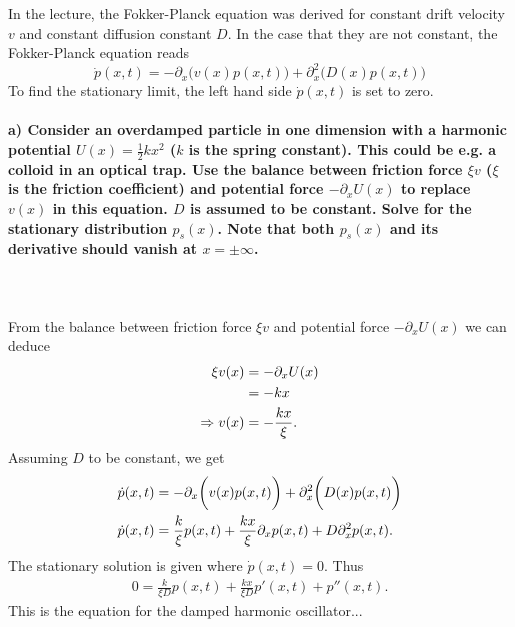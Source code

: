 In the lecture, the Fokker-Planck equation was derived for constant 
drift velocity $v$ and constant diffusion constant $D$. In the case 
that they are not constant, the Fokker-Planck equation reads
\begin{equation}
    \dot{p}(x,t)=-\partial_x\bigg(v(x)p(x,t)\bigg)+
    \partial_x^2\bigg(D(x)p(x,t)\bigg)
    \label{eq:fokker}
\end{equation}
To find the stationary limit, the left hand side $\dot p(x,t)$ is set 
to zero.

\paragraph{a) Consider an overdamped particle in one dimension with a 
    harmonic potential $U(x)=\frac{1}{2}kx^2$ ($k$ is the spring 
    constant). This could be e.g. a colloid in an optical trap. Use the 
    balance between friction force $\xi v$ ($\xi$ is the friction
    coefficient) and potential force $-\partial_xU(x)$ to replace 
    $v(x)$ in this equation. $D$ is assumed to be constant. Solve for 
    the stationary distribution $p_s(x)$. Note that both $p_s(x)$ and 
    its derivative should vanish at $x=\pm\infty$.
} \ \\
\\
    From the balance between friction force $\xi v$ and potential force 
    $-\partial_xU(x)$ we can deduce
    \begin{align}
        \xi v(x) 
        &= -\partial_xU(x) \notag \\
        &= -kx \notag \\
        \Rightarrow v(x) 
        &= -\frac{kx}{\xi}.
    \end{align}
    Assuming $D$ to be constant, we get
    \begin{align}
    	\dot{p}(x,t)&=-\partial_x\bigg(v(x)p(x,t)\bigg)+
        \partial_x^2\bigg(D(x)p(x,t)\bigg) \notag \\
        \dot{p}(x,t)&=\frac{k}{\xi} p(x,t) + \frac{kx}{\xi} \partial_x p(x,t) +
        D \partial_x^2 p(x,t) .
    \end{align}
    The stationary solution is given where $\dot{p}(x,t) = 0$. Thus
    \begin{align}
    	0 = \frac{k}{\xi D} p(x,t) + \frac{kx}{\xi D} p'(x,t) + p''(x,t).
    \end{align}
    This is the equation for the damped harmonic oscillator...


